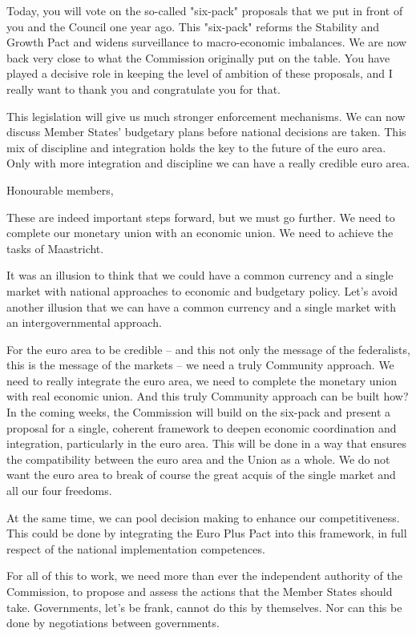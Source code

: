 \documentclass[a4paper,11pt]{article}
\begin{document}
Today, you will vote on the so-called "six-pack" proposals that we put in front of you and the Council one year ago. This "six-pack" reforms the Stability and Growth Pact and widens surveillance to macro-economic imbalances. We are now back very close to what the Commission originally put on the table. You have played a decisive role in keeping the level of ambition of these proposals, and I really want to thank you and congratulate you for that.

This legislation will give us much stronger enforcement mechanisms. We can now discuss Member States' budgetary plans before national decisions are taken. This mix of discipline and integration holds the key to the future of the euro area. Only with more integration and discipline we can have a really credible euro area.

Honourable members,

These are indeed important steps forward, but we must go further. We need to complete our monetary union with an economic union. We need to achieve the tasks of Maastricht.

It was an illusion to think that we could have a common currency and a single market with national approaches to economic and budgetary policy. Let's avoid another illusion that we can have a common currency and a single market with an intergovernmental approach.

For the euro area to be credible – and this not only the message of the federalists, this is the message of the markets – we need a truly Community approach. We need to really integrate the euro area, we need to complete the monetary union with real economic union. And this truly Community approach can be built how? In the coming weeks, the Commission will build on the six-pack and present a proposal for a single, coherent framework to deepen economic coordination and integration, particularly in the euro area. This will be done in a way that ensures the compatibility between the euro area and the Union as a whole. We do not want the euro area to break of course the great acquis of the single market and all our four freedoms.

At the same time, we can pool decision making to enhance our competitiveness. This could be done by integrating the Euro Plus Pact into this framework, in full respect of the national implementation competences.

For all of this to work, we need more than ever the independent authority of the Commission, to propose and assess the actions that the Member States should take. Governments, let's be frank, cannot do this by themselves. Nor can this be done by negotiations between governments.
\end{document}
